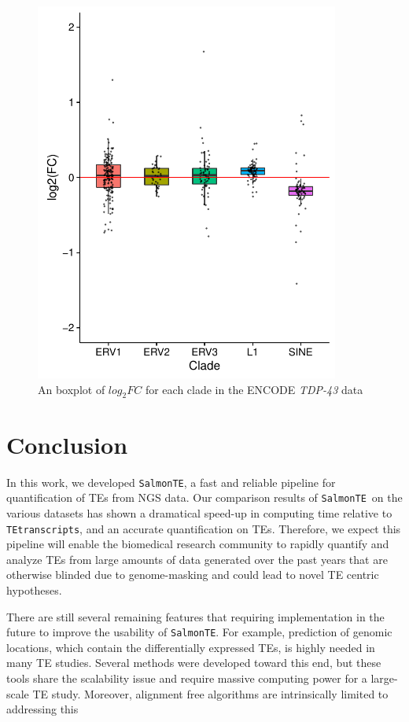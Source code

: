 \documentclass[wsdraft]{ws-procs11x85}
\newcommand{\TEtranscripts}{\texttt{TEtranscripts}}
\newcommand{\SalmonTE}{\texttt{SalmonTE}}
\begin{document}
\begin{figure}[h]
\centerline{
\includegraphics[width=10cm]{boxplot-clade-k562}
}
\caption{An boxplot of $log_{2}FC$ for each clade in the ENCODE \textit{TDP-43} data}
\label{aba:fig5}
\end{figure}

\section{Conclusion}


In this work, we developed \SalmonTE, a fast and reliable pipeline for quantification of TEs from 
NGS data.
Our comparison results of \SalmonTE~on the various datasets has shown a dramatical speed-up in computing time relative to \TEtranscripts, 
and
an accurate quantification on TEs. 
Therefore, we expect this pipeline will enable the biomedical research community to rapidly quantify and analyze TEs from large amounts of data generated over the past years that are otherwise blinded due to genome-masking and could lead to novel TE centric hypotheses.

There are still several remaining features that requiring implementation in the future to improve the usability of \SalmonTE. 
For example, prediction of genomic locations, which contain the differentially expressed TEs, is highly needed in many TE studies. Several methods were developed toward this end\cite{de2017identifying,criscione2014transcriptional}, but these tools share the scalability issue and require massive computing power for a large-scale TE study. 
Moreover, alignment free algorithms are intrinsically limited to addressing this 
\end{document}
